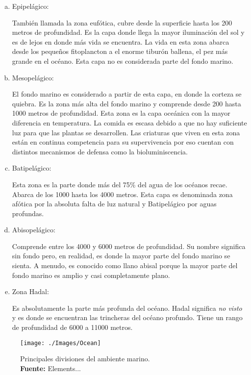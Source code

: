 \begin{enumerate}[(a)]
\item Epipelágico:

También llamada la zona eufótica, cubre desde la superficie hasta los 200 metros de profundidad. Es la capa donde llega la mayor iluminación del sol y es de lejos en donde más vida se encuentra. La vida en esta zona abarca desde los pequeños fitoplancton a el enorme tiburón ballena, el pez más grande en el océano. Esta capa no es considerada parte del fondo marino.

\item Mesopelágico:

El fondo marino es considerado a partir de esta capa, en donde la corteza se quiebra. Es la zona más alta del fondo marino y comprende desde 200 hasta 1000 metros de profundidad. Esta zona es la capa oceánica con la mayor diferencia en temperatura. La comida es escasa debido a que no hay suficiente luz para que las plantas se desarrollen. Las criaturas que viven en esta zona están en continua competencia para su supervivencia por eso cuentan con distintos mecanismos de defensa como la bioluminiscencia.

\item Batipelágico:

Esta zona es la parte donde más del 75\% del agua de los océanos recae. Abarca de los 1000 hasta los 4000 metros. Esta capa es denominada zona afótica por la absoluta falta de luz natural y Batipelágico por aguas profundas.

\item Abisopelágico:

Comprende entre los 4000 y 6000 metros de profundidad. Su nombre significa sin fondo pero, en realidad, es donde la mayor parte del fondo marino se sienta. A menudo, es conocido como llano abisal porque la mayor parte del fondo marino es amplio y casi completamente plano.

\item Zona Hadal: 

Es absolutamente la parte más profunda del océano. Hadal significa \textit{no visto} y es donde se encuentran las trincheras del océano profundo. Tiene un rango de profundidad de 6000 a 11000 metros. 
\end{enumerate}


\begin{figure}[!htb]
\centering
\texttt{[image: ./Images/Ocean]}
\caption{Principales divisiones del ambiente marino.\\
 \textbf{Fuente:} Elements...~\cite{Gumiaux2003}}
\label{fig:OceanClass}
\end{figure}


